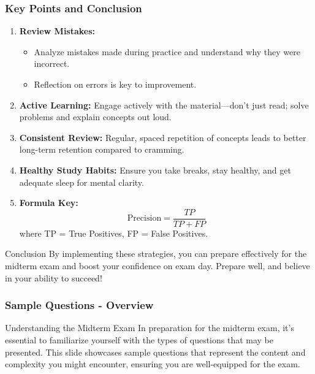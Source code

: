 \documentclass[aspectratio=169]{beamer}
\begin{document}
\begin{frame}[fragile]
    \frametitle{Key Points and Conclusion}
    \begin{enumerate}
        \item \textbf{Review Mistakes:}
            \begin{itemize}
                \item Analyze mistakes made during practice and understand why they were incorrect.
                \item Reflection on errors is key to improvement.
            \end{itemize}

        \item \textbf{Active Learning:}
            Engage actively with the material—don’t just read; solve problems and explain concepts out loud.

        \item \textbf{Consistent Review:}
            Regular, spaced repetition of concepts leads to better long-term retention compared to cramming.

        \item \textbf{Healthy Study Habits:}
            Ensure you take breaks, stay healthy, and get adequate sleep for mental clarity.

        \item \textbf{Formula Key:}
            \[
            \text{Precision} = \frac{TP}{TP + FP}
            \]
            where TP = True Positives, FP = False Positives.

    \end{enumerate}

    \begin{block}{Conclusion}
        By implementing these strategies, you can prepare effectively for the midterm exam and boost your confidence on exam day. Prepare well, and believe in your ability to succeed!
    \end{block}
\end{frame}

\begin{frame}[fragile]
    \frametitle{Sample Questions - Overview}
    \begin{block}{Understanding the Midterm Exam}
        In preparation for the midterm exam, it’s essential to familiarize yourself with the types of questions that may be presented. 
        This slide showcases sample questions that represent the content and complexity you might encounter, ensuring you are well-equipped for the exam.
    \end{block}
\end{frame}
\end{document}
